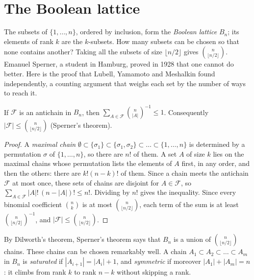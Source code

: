 \section{The Boolean lattice}

The subsets of $\{1,\dots,n\}$, ordered by inclusion, form the \emph{Boolean lattice} $B_n$; its elements of rank $k$ are the $k$-subsets. How
many subsets can be chosen so that none contains another? Taking all the subsets of size $\lfloor n/2\rfloor$ gives $\binom n{\lfloor n/2\rfloor}$. Emanuel
Sperner, a student in Hamburg, proved in 1928 that one cannot do better. Here is the proof that Lubell, Yamamoto and
Meshalkin found independently, a counting argument that weighs each set by the number of ways to reach it.

\begin{theorem}\label{orders:thm:lym}
If $\mathcal F$ is an antichain in $B_n$, then $\displaystyle\sum_{A\in\mathcal F}\binom n{|A|}^{-1}\le1$. Consequently $|\mathcal F|\le\binom n{\lfloor n/2\rfloor}$ (Sperner's theorem).
\end{theorem}
\begin{proof}
A \emph{maximal chain} $\emptyset\subset\{\sigma_1\}\subset\{\sigma_1,\sigma_2\}\subset\dots\subset\{1,\dots,n\}$ is determined by a permutation $\sigma$ of $\{1,\dots,n\}$, so there are $n!$ of them. A set $A$
of size $k$ lies on the maximal chains whose permutation lists the elements of $A$ first, in any order, and then the others:
there are $k!(n-k)!$ of them. Since a chain meets the antichain $\mathcal F$ at most once, these sets of chains are disjoint for $A\in\mathcal F$, so
$\sum_{A\in\mathcal F}|A|!\,(n-|A|)!\le n!$. Dividing by $n!$ gives the inequality. Since every binomial coefficient $\binom nk$ is at most $\binom n{\lfloor n/2\rfloor}$, each term of
the sum is at least $\binom n{\lfloor n/2\rfloor}^{-1}$, and $|\mathcal F|\le\binom n{\lfloor n/2\rfloor}$.
\end{proof}

By Dilworth's theorem, Sperner's theorem says that $B_n$ is a union of $\binom n{\lfloor n/2\rfloor}$ chains. These chains can be chosen
remarkably well. A chain $A_1\subset A_2\subset\dots\subset A_m$ in $B_n$ is \emph{saturated} if $|A_{i+1}|=|A_i|+1$, and \emph{symmetric} if moreover $|A_1|+|A_m|=n$: it climbs
from rank $k$ to rank $n-k$ without skipping a rank.

